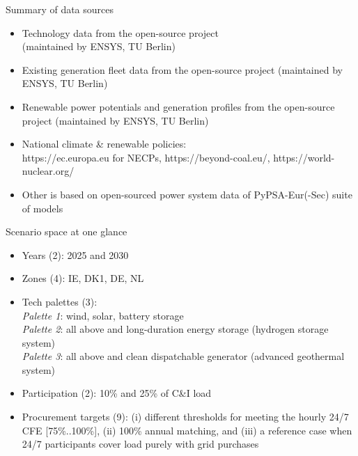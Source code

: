 \begin{frame}{Summary of data sources}

  \begin{itemize}
\item Technology data from the open-source  project \\ (maintained by ENSYS, TU Berlin)
\item Existing generation fleet data from the open-source  project (maintained by ENSYS, TU Berlin)
\item Renewable power potentials and generation profiles from the open-source  project (maintained by ENSYS, TU Berlin)
\item National climate \& renewable policies:  \\ https://ec.europa.eu for NECPs, https://beyond-coal.eu/, https://world-nuclear.org/
\item Other is based on open-sourced power system data of PyPSA-Eur(-Sec) suite of models 
  \end{itemize}

\end{frame}


\begin{frame}{Scenario space at one glance}
\centering

\begin{itemize}
    \item Years (2): 2025 and 2030
    \item Zones (4): IE, DK1, DE, NL
    \item Tech palettes (3): \\
        \emph{Palette 1}: wind, solar, battery  storage \\
        \emph{Palette 2}: all above and long-duration energy storage (hydrogen storage system) \\
        \emph{Palette 3}: all above and clean dispatchable generator (advanced geothermal system)
    \item Participation (2): 10\% and 25\% of C\&I load 
    \item Procurement targets (9): (i) different thresholds for
meeting the hourly 24/7 CFE [75\%..100\%], (ii) 100\% annual matching, and (iii) a reference case when 24/7 participants cover load purely with grid purchases
\end{itemize}

\end{frame}


